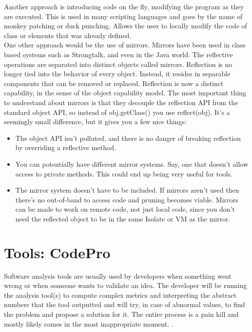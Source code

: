 	Another approach is introducing code on the fly, modifying the program as they
are executed. This is used in many scripting languages and goes by the name of
monkey patching or duck punching. Allows the user to locally modify the code of
class or elements that was already defined. \\
	One other approach would be the use of mirrors.
Mirrors have been used in class based systems such as Strongtalk, and even in
the Java world. The reflective operations are separated into distinct objects
called mirrors. Reflection is no longer tied into the behavior of every object.
Instead, it resides in separable components that can be removed or replaced. 
Reflection is now a distinct capability, in the sense of the object capability model.
	The most important thing to understand about mirrors is that they decouple the
reflection API from the standard object API, so instead of obj.getClass() you use reflect(obj). 
It's a seemingly small difference, but it gives you a few nice things:
	\begin{itemize}
		\item The object API isn't polluted, and there is no danger of breaking
reflection by overriding a reflective method.
		\item You can potentially have different mirror systems. Say, one that doesn't
allow access to private methods. This could end up being very useful for tools.
		\item The mirror system doesn't have to be included. If mirrors aren't used then there's no out-of-band to access code and 
pruning becomes viable.
Mirrors can be made to work on remote code, not just local code, since you don't need the reflected object to be in the same Isolate or VM as the mirror.	
	\end{itemize}

\section{Tools: CodePro}\label{ch:2.2}

	Software analysis tools are usually used by developers when something went
wrong or when someone wants to validate an idea. The developer will be running
the analysis tool(s) to compute complex metrics and interpreting the abstract numbers 
that the tool outputted and will try, in case of abnormal values, to find the
problem and propose a solution for it. The entire process is a pain kill and
mostly likely comes in the most inappropriate moment. \cite{tools:inCode}.

